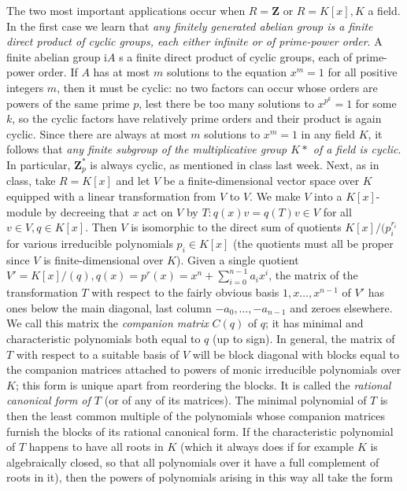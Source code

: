 \documentclass[10pt]{article}
\begin{document}
The two most important applications occur when $R=\mathbf{Z}$ or
$R=K[x], K$ a field. In the first case we learn that {\sl any finitely
  generated abelian group is a finite direct product of cyclic groups,
  each either infinite or of prime-power order}. A finite abelian group
i$A$ s a finite direct product of cyclic groups, each of prime-power
order. If $A$ has at most $m$ solutions to the equation $x^m = 1$ for
all positive integers $m$, then it must be cyclic: no two factors can
occur whose orders are powers of the same prime $p$, lest there be too
many solutions to $x^{p^k}= 1$ for some $k$, so the cyclic factors have
relatively prime orders and their product is again cyclic. Since there
are always at most $m$ solutions to $x^m = 1$ in any field $K$, it
follows that {\sl any finite subgroup of the multiplicative group $K*$
  of a field is cyclic}. In particular, $\mathbf{Z}_p^*$ is always
cyclic, as mentioned in class last week. Next, as in class, take
$R=K[x]$ and let $V$ be a finite-dimensional vector space over $K$
equipped with a linear transformation from $V$ to $V$. We make $V$ into
a $K[x]$-module by decreeing that $x$ act on $V$ by $T: q(x) v = q(T)
v\in V$ for all $v\in V, q\in K[x]$. Then $V$ is isomorphic to the
direct sum of quotients $K[x]/(p_i^{r_i}$ for various irreducible
polynomials $p_i\in K[x]$ (the quotients must all be proper since $V$ is
finite-dimensional over $K$). Given a single quotient $V'=K[x]/(q), q(x)
= p^r(x) = x^n + \sum_{i=0}^{n-1} a_i x^i$, the matrix of the
transformation $T$ with respect to the fairly obvious basis
$1,x\ldots,x^{n-1}$ of $V'$ has ones below the main diagonal, last
column $-a_0,\ldots,-a_{n-1}$ and zeroes elsewhere. We call this matrix
the {\sl companion matrix} $C(q)$ of $q$; it has minimal and
characteristic polynomials both equal to $q$ (up to sign). In general,
the matrix of $T$ with respect to a suitable basis of $V$ will be block
diagonal with blocks equal to the companion matrices attached to powers
of monic irreducible polynomials over $K$; this form is unique apart
from reordering the blocks. It is called the {\sl rational canonical
  form of $T$} (or of any of its matrices). The minimal polynomial of
$T$ is then the least common multiple of the polynomials whose companion
matrices furnish the blocks of its rational canonical form. If the
characteristic polynomial of $T$ happens to have all roots in $K$ (which
it always does if for example $K$ is algebraically closed, so that all
polynomials over it have a full complement of roots in it), then the
powers of polynomials arising in this way all take the form
\end{document}
